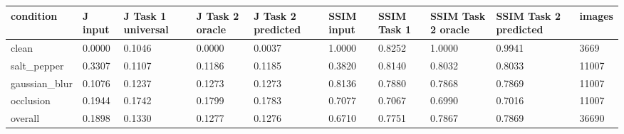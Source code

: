 \begin{tabular}{llllllllll}
\hline
condition & J input & J Task 1 universal & J Task 2 oracle & J Task 2 predicted & SSIM input & SSIM Task 1 & SSIM Task 2 oracle & SSIM Task 2 predicted & images \\
\hline
clean & 0.0000 & 0.1046 & 0.0000 & 0.0037 & 1.0000 & 0.8252 & 1.0000 & 0.9941 & 3669 \\
salt\_pepper & 0.3307 & 0.1107 & 0.1186 & 0.1185 & 0.3820 & 0.8140 & 0.8032 & 0.8033 & 11007 \\
gaussian\_blur & 0.1076 & 0.1237 & 0.1273 & 0.1273 & 0.8136 & 0.7880 & 0.7868 & 0.7869 & 11007 \\
occlusion & 0.1944 & 0.1742 & 0.1799 & 0.1783 & 0.7077 & 0.7067 & 0.6990 & 0.7016 & 11007 \\
overall & 0.1898 & 0.1330 & 0.1277 & 0.1276 & 0.6710 & 0.7751 & 0.7867 & 0.7869 & 36690 \\
\hline
\end{tabular}
